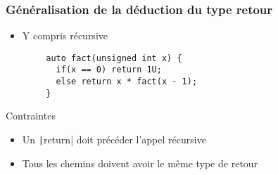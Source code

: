 \documentclass[C++.tex]{subfiles}
\begin{document}
\begin{frame}[fragile]
	\frametitle{Généralisation de la déduction du type retour}
	\begin{itemize}
		\item Y compris récursive
	\end{itemize}

	\begin{verbatim}
		auto fact(unsigned int x) {
		  if(x == 0) return 1U;
		  else return x * fact(x - 1);
		}
	\end{verbatim}

	\begin{alertblock}{Contraintes}
		\begin{itemize}
			\item Un \texttt|return| doit précéder l'appel récursive
			\item Tous les chemins doivent avoir le même type de retour
		\end{itemize}
	\end{alertblock}

\end{frame}
\end{document}
